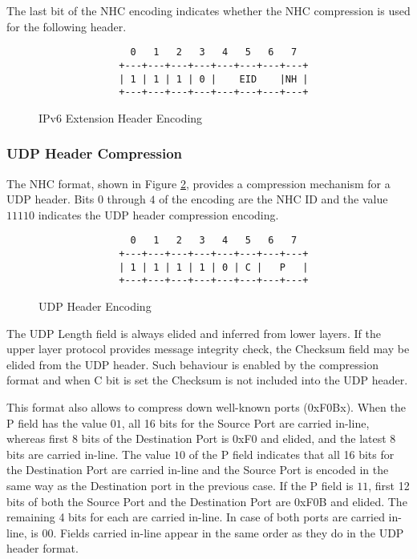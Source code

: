 \documentclass[12pt, titlepage, a4paper]{report}
\newenvironment{mylisting}
{\begin{list}{}{\setlength{\leftmargin}{1em}}\item\footnotesize}
{\end{list}}
\begin{document}
The last bit of the NHC encoding indicates whether the NHC compression is used for the following header.
\begin{figure}[htp]
\begin{mylisting}
\begin{verbatim}
                0   1   2   3   4   5   6   7
              +---+---+---+---+---+---+---+---+
              | 1 | 1 | 1 | 0 |    EID    |NH |
              +---+---+---+---+---+---+---+---+
\end{verbatim}
\end{mylisting}
\caption{IPv6 Extension Header Encoding}\label{fig:ipv6.ext.header}
\end{figure}


\subsubsection{UDP Header Compression}
The NHC format, shown in Figure \ref{fig:udp.header.enc}, provides a compression mechanism for a UDP header.  Bits $0$ through $4$ of the encoding are the NHC ID and the value $11110$ indicates the UDP header compression encoding.

\begin{figure}[htp]
\begin{mylisting}
\begin{verbatim}
                0   1   2   3   4   5   6   7
              +---+---+---+---+---+---+---+---+
              | 1 | 1 | 1 | 1 | 0 | C |   P   |
              +---+---+---+---+---+---+---+---+
\end{verbatim}
\end{mylisting}
\caption{UDP Header Encoding}\label{fig:udp.header.enc}
\end{figure}

The UDP Length field is always elided and inferred from lower layers. If the upper layer protocol provides message integrity check, the Checksum field may be elided from the UDP header. Such behaviour is enabled by the compression format and when C bit is set the Checksum is not included into the UDP header.

This format also allows to compress down well-known ports (0xF0Bx). When the P field has the value $01$, all 16 bits for the Source Port are carried in-line, whereas first 8 bits of the Destination Port is 0xF0 and elided, and the latest 8 bits are carried in-line. The value $10$ of the P field indicates that all 16 bits for the Destination Port are carried in-line and the Source Port is encoded in the same way as the Destination port in the previous case. If the P field is $11$, first 12 bits of both the Source Port and the Destination Port are 0xF0B and elided. The remaining 4 bits for each are carried in-line. In case of both ports are carried in-line, is $00$. Fields carried in-line appear in the same order as they do in the UDP header format.
\end{document}
